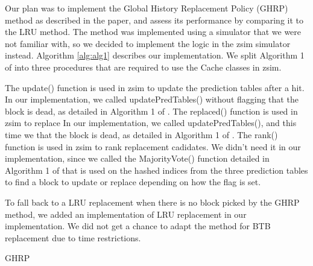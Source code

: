 \documentclass[11pt]{article}
\begin{document}
Our plan was to implement the Global History Replacement Policy (GHRP) method as described in the paper, and assess its performance by comparing it to the LRU method.
The method was implemented using a simulator that we were not familiar with, so we decided to implement the logic in the zsim simulator instead.
Algorithm \ref{alg:alg1} describes our implementation. We split Algorithm 1 of \cite{samira-ISCA18} into three procedures that are required to use the Cache classes in zsim.\par

The update() function is used in zsim to update the prediction tables after a hit. In our implementation, we called updatePredTables() without flagging that the block is dead, as detailed in Algorithm 1 of \cite{samira-ISCA18}. 
The replaced() function is used in zsim to replace In our implementation, we called updatePredTables(), and this time we that the block is dead, as detailed in Algorithm 1 of \cite{samira-ISCA18}.
The rank() function is used in zsim to rank replacement cadidates. We didn't need it in our implementation, since we called the MajorityVote() function detailed in Algorithm 1 of \cite{samira-ISCA18} that is used on the hashed indices from the three prediction tables to find a block to update or replace depending on how the flag is set.\par

To fall back to a LRU replacement when there is no block picked by the GHRP method, we added an implementation of LRU replacement in our implementation.
We did not get a chance to adapt the method for BTB replacement due to time restrictions.
\begin{algorithm}[h]
	\caption{GHRP}
	\label{alg:alg1}
	\begin{algorithmic}[1]
		\renewcommand{\algorithmicrequire}{\textbf{Input: address}}
		\EndProcedure
		\EndProcedure
	\end{algorithmic}
\end{algorithm}
\end{document}
